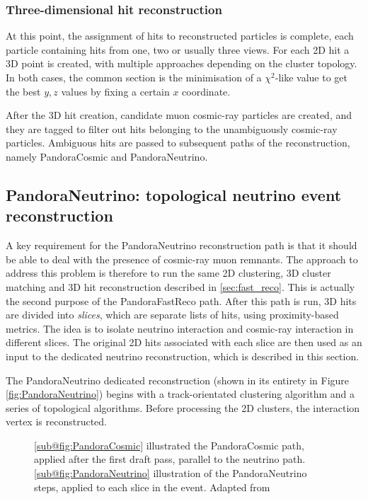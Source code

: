 \subsubsection{Three-dimensional hit reconstruction}

At this point, the assignment of hits to reconstructed particles is complete, each particle containing hits from one, two or usually three views. For each 2D hit a 3D point is created, with multiple approaches depending on the cluster topology. In both cases, the common section is the minimisation of a $\chi^2$-like value to get the best $y,z$ values by fixing a certain $x$ coordinate. 

After the 3D hit creation, candidate muon cosmic-ray particles are created, and they are tagged to filter out hits belonging to the unambiguously cosmic-ray particles. Ambiguous hits are passed to subsequent paths of the reconstruction, namely PandoraCosmic and PandoraNeutrino. 

\subsection{PandoraNeutrino: topological neutrino event reconstruction} \label{sec:PandoraNeutrino}

A key requirement for the PandoraNeutrino reconstruction path is that it should be able to deal with the presence of cosmic-ray muon remnants. The approach to address this problem is therefore to run the same 2D clustering, 3D cluster matching and 3D hit reconstruction described in \autoref{sec:fast_reco}. This is actually the second purpose of the PandoraFastReco path. After this path is run, 3D hits are divided into \emph{slices}, which are separate lists of hits, using proximity-based metrics. The idea is to isolate neutrino interaction and cosmic-ray interaction in different slices. The original 2D hits associated with each slice are then used as an input to the dedicated neutrino reconstruction, which is described in this section. 

The PandoraNeutrino dedicated reconstruction (shown in its entirety in Figure \ref{fig:PandoraNeutrino}) begins with a track-orientated clustering algorithm and a series of topological algorithms. Before processing the 2D clusters, the interaction vertex is reconstructed. 

\begin{figure}
    \centering
    \caption[PandoraCosmic and PandoraNeutrino paths illustration]{\ref{sub@fig:PandoraCosmic} illustrated the PandoraCosmic path, applied after the first draft pass, parallel to the neutrino path. \ref{sub@fig:PandoraNeutrino} illustration of the PandoraNeutrino steps, applied to each slice in the event. Adapted from \cite{MicroBooNE:2017xvs}}
    \label{fig:PandoraCosmicNeutrino}
\end{figure}

